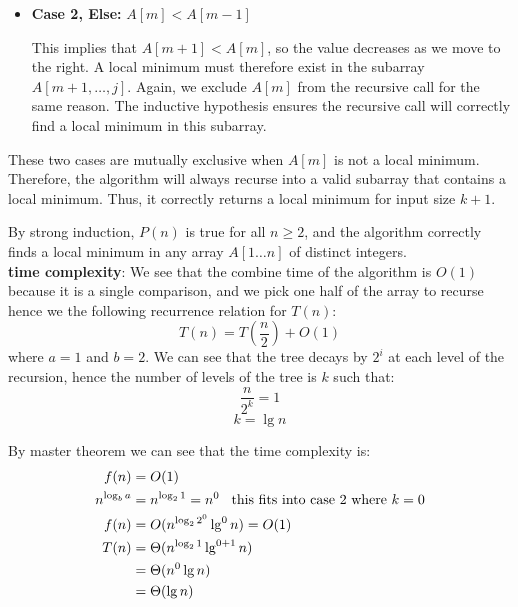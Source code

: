 \begin{parts}
\begin{customsolutionbox}
\begin{itemize}
                \item \textbf{Case 2, Else:} $A[m] < A[m - 1]$ 
            
                This implies that $A[m + 1] < A[m]$, so the value decreases as we move to the right.
                A local minimum must therefore exist in the subarray $A[m + 1, \ldots, j]$.
                Again, we exclude $A[m]$ from the recursive call for the same reason. The inductive hypothesis ensures the recursive call 
                will correctly find a local minimum in this subarray.
            \end{itemize}
            

            These two cases are mutually exclusive when $A[m]$ is not a local minimum. Therefore, 
            the algorithm will always recurse into a valid subarray that contains a local minimum. Thus, it 
            correctly returns a local minimum for input size $k+1$.

            By strong induction, $P(n)$ is true for all $n \geq 2$, and the algorithm correctly finds a local 
            minimum in any array $A[1 \ldots n]$ of distinct integers. \\

            \textbf{time complexity}: We see that the combine time of the algorithm is $O(1)$ because it is a single comparison, and we 
            pick one half of the array to recurse  hence we the following recurrence relation for $T(n)$:
            \[T(n) = T\left(\frac{n}{2}\right) + O(1)\] 
            where  $a = 1$ and $b = 2$. We can see that the tree decays by $2^i$ at each level of the recursion, hence 
            the number of levels of the tree is $k$ such that:
            \[\frac{n}{2^k} = 1\]
            \[k = \lg n\]
            
            By master theorem  we can see that the time complexity is:
            \begin{align*}
                f(n) &= O(1) \\
                n^{\log_b a} &= n^{\log_2 1} = n^0  \hs \hs \hs \text{this fits into case 2 where $k=0$} \\
                f(n) &= O(n^{\log_2 2^0} \lg^0 n)  = O(1)\\
                T(n) &= \Theta(n^{\log_2 1} \lg^{0+1} n) \\
                &= \Theta(n^0 \lg n) \\
                &= \Theta(\lg n) \\
            \end{align*}
        \end{customsolutionbox}
\end{parts}